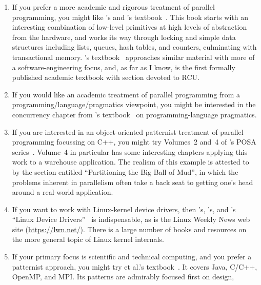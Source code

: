 \begin{enumerate}
\item	If you prefer a more academic and rigorous treatment of
	parallel programming,
	you might like 's and 's
	textbook~\cite{HerlihyShavit2008Textbook,HerlihyShavit2020Textbook}.
	This book starts with an interesting combination
	of low-level primitives at high levels of abstraction
	from the hardware, and works its way through locking
	and simple data structures including lists, queues,
	hash tables, and counters, culminating with transactional
	memory.
	's textbook~\cite{MichaelScott2013Textbook}
	approaches similar material with more of a
	software-engineering focus, and, as far as I know, is
	the first formally published academic textbook with
	section devoted to RCU\@.
\item	If you would like an academic treatment of parallel
	programming from a programming\-/language\-/pragmatics viewpoint,
	you might be interested in the concurrency chapter from
	's
	textbook~\cite{MichaelScott2006Textbook,MichaelScott2015Textbook}
	on programming-language pragmatics.
\item	If you are interested in an object-oriented patternist
	treatment of parallel programming focussing on C++,
	you might try Volumes~2 and~4 of 's POSA
	series~\cite{SchmidtStalRohnertBuschmann2000v2Textbook,
	BuschmannHenneySchmidt2007v4Textbook}.
	Volume~4 in particular has some interesting chapters
	applying this work to a warehouse application.
	The realism of this example is attested to by
	the section entitled ``Partitioning the Big Ball of Mud'',
	in which the problems inherent in parallelism often take a back
	seat to getting one's head around a real-world application.
\item	If you want to work with Linux-kernel device drivers,
	then 's, 's,
	and 's
	``Linux Device Drivers''~\cite{CorbetRubiniKroahHartman}
	is indispensable, as is the Linux Weekly News web site
	(\url{https://lwn.net/}).
	There is a large number of books and resources on
	the more general topic of Linux kernel internals.
\item	If your primary focus is scientific and technical computing,
	and you prefer a patternist approach,
	you might try  et al.'s
	textbook~\cite{Mattson2005Textbook}.
	It covers Java, C/C++, OpenMP, and MPI\@.
	Its patterns are admirably focused first on design,

\end{enumerate}
